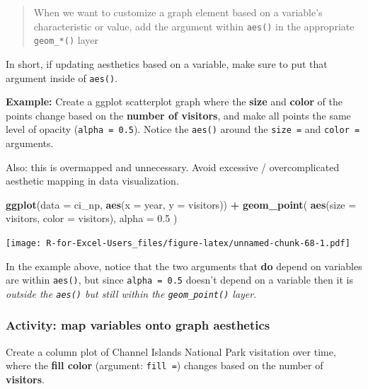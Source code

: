 \documentclass[]{book}
\newenvironment{Shaded}{\begin{snugshade}}{\end{snugshade}}
\newcommand{\DataTypeTok}[1]{\textcolor[rgb]{0.13,0.29,0.53}{#1}}
\newcommand{\FloatTok}[1]{\textcolor[rgb]{0.00,0.00,0.81}{#1}}
\newcommand{\KeywordTok}[1]{\textcolor[rgb]{0.13,0.29,0.53}{\textbf{#1}}}
\newcommand{\NormalTok}[1]{#1}
\newcommand{\OperatorTok}[1]{\textcolor[rgb]{0.81,0.36,0.00}{\textbf{#1}}}
\newcommand{\StringTok}[1]{\textcolor[rgb]{0.31,0.60,0.02}{#1}}
\begin{document}
\begin{quote}
When we want to customize a graph element based on a variable's characteristic or value, add the argument within \texttt{aes()} in the appropriate \texttt{geom\_*()} layer
\end{quote}

In short, if updating aesthetics based on a variable, make sure to put that argument inside of \texttt{aes()}.

\textbf{Example:} Create a ggplot scatterplot graph where the \textbf{size} and \textbf{color} of the points change based on the \textbf{number of visitors}, and make all points the same level of opacity (\texttt{alpha\ =\ 0.5}). Notice the \texttt{aes()} around the \texttt{size\ =} and \texttt{color\ =} arguments.

Also: this is overmapped and unnecessary. Avoid excessive / overcomplicated aesthetic mapping in data visualization.

\begin{Shaded}
\begin{Highlighting}[]
\KeywordTok{ggplot}\NormalTok{(}\DataTypeTok{data =}\NormalTok{ ci_np, }\KeywordTok{aes}\NormalTok{(}\DataTypeTok{x =}\NormalTok{ year, }\DataTypeTok{y =}\NormalTok{ visitors)) }\OperatorTok{+}
\StringTok{  }\KeywordTok{geom_point}\NormalTok{(}
    \KeywordTok{aes}\NormalTok{(}\DataTypeTok{size =}\NormalTok{ visitors,}
        \DataTypeTok{color =}\NormalTok{ visitors),}
    \DataTypeTok{alpha =} \FloatTok{0.5}
\NormalTok{  )}
\end{Highlighting}
\end{Shaded}

\texttt{[image: R-for-Excel-Users\_files/figure-latex/unnamed-chunk-68-1.pdf]}

In the example above, notice that the two arguments that \textbf{do} depend on variables are within \texttt{aes()}, but since \texttt{alpha\ =\ 0.5} doesn't depend on a variable then it is \emph{outside the \texttt{aes()} but still within the \texttt{geom\_point()} layer}.

\hypertarget{activity-map-variables-onto-graph-aesthetics}{%
\subsubsection{Activity: map variables onto graph aesthetics}\label{activity-map-variables-onto-graph-aesthetics}}

Create a column plot of Channel Islands National Park visitation over time, where the \textbf{fill color} (argument: \texttt{fill\ =}) changes based on the number of \textbf{visitors}.
\end{document}
